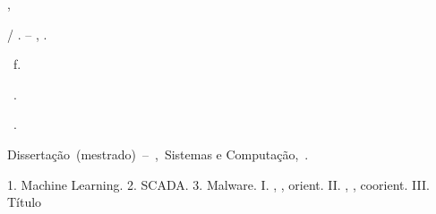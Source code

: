 \documentclass[
	12pt,				%
	openright,			%
    oneside,
	a4paper,			%
	chapter=TITLE,
	english,			%
	brazil				%
	]{./abntex2}
\newcommand{\programaresumido}{Sistemas e Computação}
\newcommand{\tipotrabalhoa}{Dissertação}
\newcommand{\tipotrabalhob}{Mestrado}
\newcommand{\keywordone}{Machine Learning}
\newcommand{\keywordtwo}{SCADA}
\newcommand{\keywordthree}{Malware}
\begin{document}
\begin{fichacatalografica}
\begin{center}
{\begin{minipage}[c][10cm]{13.5cm}
                \hspace{0.5cm}\parbox[t]{\textwidth-1cm}{
                    \imprimirsobrenomeautor, \imprimirnomeautor \par
                    \hspace{0.5cm}\imprimirtitulo\space / \imprimirautor. --
                    \imprimirlocal, \imprimirdata. \par
                    \hspace{0.5cm}\thelastpage\ f.
                }\par
                \vspace{0.5cm}
                \hspace{0.5cm}\parbox[t]{\textwidth-1cm}{
                    \imprimirorientadorRotulo~\imprimirorientador.\par
                    \vspace{0.5cm}
                    \imprimircoorientadorRotulo~\imprimircoorientador.
                }\par
                \vspace{0.5cm}
                \hspace{0.5cm}\parbox[t]{\textwidth-1cm}{
                    \tipotrabalhoa\  (\MakeLowercase{\tipotrabalhob})~--~\imprimirinstituicao,\ \programaresumido,\ \imprimirdata.
                }\par
                \vspace{0.5cm}
                \hspace{0.5cm}\parbox[t]{\textwidth-1cm}{
                    \hspace{0.5cm}1. \keywordone.
                    2. \keywordtwo.
                    3. \keywordthree.
                    I. \imprimirsobrenomeorientador, \imprimirnomeorientador, orient.
                    II. \imprimirsobrenomecoorientador, \imprimirnomecoorientador, coorient.
                    III. Título
                }
        \end{minipage}}
    \end{center}
\end{fichacatalografica}

\end{document}
